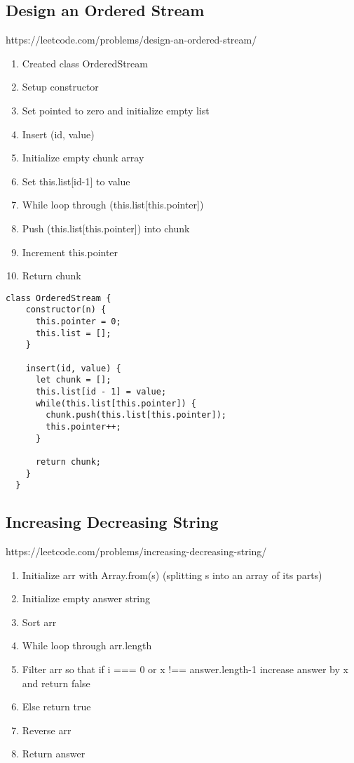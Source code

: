 \documentclass[10pt]{article}
\begin{document}
\pagebreak %
\medskip   
\subsection{Design an Ordered Stream}
https://leetcode.com/problems/design-an-ordered-stream/

\begin{enumerate}
	\item Created class OrderedStream
	\item Setup constructor
	\item Set pointed to zero and initialize empty list 
	\item Insert (id, value)
	\item Initialize empty chunk array
	\item Set this.list[id-1] to value
	\item While loop through (this.list[this.pointer])
	\item Push (this.list[this.pointer]) into chunk
	\item Increment this.pointer
	\item Return chunk 
\end{enumerate}

\begin{lstlisting}[title=Solution orderedStream, captionpos=t]
class OrderedStream {
    constructor(n) {
      this.pointer = 0;
      this.list = [];
    }
  
    insert(id, value) {
      let chunk = [];
      this.list[id - 1] = value;
      while(this.list[this.pointer]) {
        chunk.push(this.list[this.pointer]);
        this.pointer++;
      }
      
      return chunk;
    }
  }
\end{lstlisting}
\medskip %




\pagebreak %
\medskip   
\subsection{Increasing Decreasing String}
https://leetcode.com/problems/increasing-decreasing-string/

\begin{enumerate}
	\item Initialize arr with Array.from(s) (splitting s into an array of its parts)
	\item Initialize empty answer string
	\item Sort arr 
	\item While loop through arr.length
	\item Filter arr so that if i === 0 or x !== answer.length-1 increase answer by x and return false
	\item Else return true 
	\item Reverse arr
	\item Return answer 
\end{enumerate}
\end{document}
